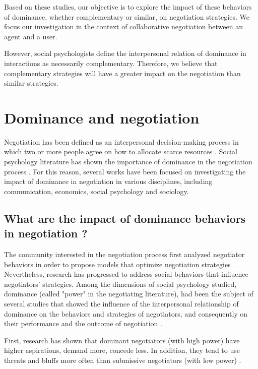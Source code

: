 \documentclass{llncs}
\begin{document}
	Based on these studies, our objective is to explore the impact of these  behaviors of dominance, whether complementary or similar, on negotiation strategies. We focus our investigation in the context of collaborative negotiation between an agent and a user. 
	
	However, social psychologists define the interpersonal relation of dominance in interactions as necessarily complementary. Therefore, we believe that complementary strategies will have a greater impact on the negotiation than similar strategies.
	
	\section{Dominance and negotiation}	
	\label{sec:Dom}
	Negotiation has been defined as an interpersonal decision-making process in which two or more people agree on how to allocate scarce resources \cite {thompson2000mind}.  Social psychology literature has shown the importance of dominance in the negotiation process \cite{de1995impact,van2006power,fiske1993controlling}. For this reason, several works have been focused on investigating the impact of dominance in negotiation in various disciplines, including communication, economics, social psychology and sociology.
	
	\subsection{What are the impact of dominance behaviors in negotiation ?}
	
	The community interested in the negotiation process first analyzed negotiator behaviors in order to propose models that optimize negotiation strategies \cite{thompson2010negotiation}.
	Nevertheless, research has progressed to address  social behaviors that influence negotiators' strategies. 
	Among the dimensions of social psychology studied, dominance (called "power" in the negotiating literature), had been the subject of several studies that showed the influence of the interpersonal relationship of dominance on the behaviors and strategies of negotiators, and consequently on their performance and the outcome of negotiation \cite{de1995impact,van2006power}.
	
	First, research has shown that dominant negotiators (with high power) have higher aspirations, demand more, concede less. In addition, they tend to use threats and bluffs more often than submissive negotiators (with low power) \cite{de1995impact}.
	
\end{document}
